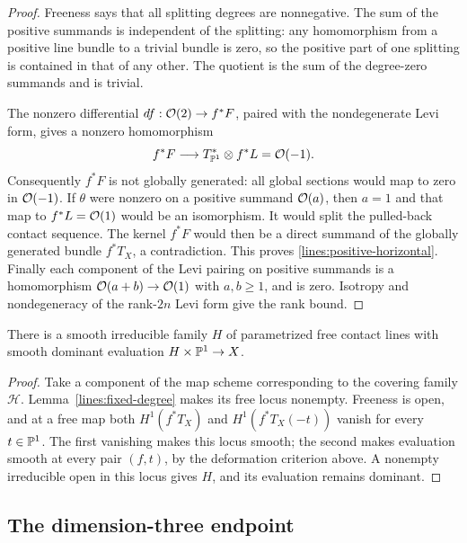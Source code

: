 \begin{proof}
Freeness says that all splitting degrees are nonnegative.
The sum of the positive summands is independent of the splitting:
any homomorphism from a positive line bundle to a trivial bundle
is zero, so the positive part of one splitting is contained in
that of any other. The quotient is the sum of the degree-zero
summands and is trivial.

The nonzero differential $df:\mathcal O(2)\to f^*F$, paired with the
nondegenerate Levi form, gives a nonzero homomorphism
\[
f^*F\longrightarrow
T^*_{\mathbb P^1}\otimes f^*L=\mathcal O(-1).
\]
Consequently $f^*F$ is not globally generated: all global sections
would map to zero in $\mathcal O(-1)$. If $\theta$ were nonzero on a
positive summand $\mathcal O(a)$, then $a=1$ and that map to $f^*L=\mathcal O(1)$
would be an isomorphism. It would split the pulled-back contact
sequence. The kernel $f^*F$ would then be a direct summand of the
globally generated bundle $f^*T_X$, a contradiction. This proves
\eqref{lines:positive-horizontal}. Finally each component of the
Levi pairing on positive summands is a homomorphism
$\mathcal O(a+b)\to\mathcal O(1)$ with $a,b\geq1$, and is zero. Isotropy and
nondegeneracy of the rank-$2n$ Levi form give the rank bound.
\end{proof}

\begin{corollary}\label{lines:free-cover}
There is a smooth irreducible family $H$ of parametrized free
contact lines with smooth dominant evaluation
$H\times\mathbb P^1\to X$.
\end{corollary}

\begin{proof}
Take a component of the map scheme corresponding to the covering
family $\mathcal H$. Lemma~\ref{lines:fixed-degree} makes its free
locus nonempty. Freeness is open, and at a free map both
$H^1(f^*T_X)$ and $H^1(f^*T_X(-t))$ vanish for every $t\in\mathbb P^1$.
The first vanishing makes this locus smooth; the second makes
evaluation smooth at every pair $(f,t)$, by the deformation
criterion above. A nonempty irreducible open in this locus gives
$H$, and its evaluation remains dominant.
\end{proof}

\subsection{The dimension-three endpoint}

